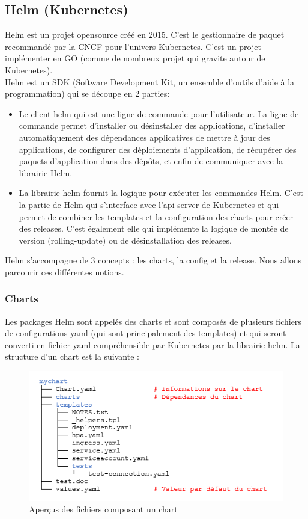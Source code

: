 \documentclass[11pt,fleqn]{book} %
\begin{document}
\subsection{Helm (Kubernetes)}
Helm est un projet opensource créé en 2015. C'est le gestionnaire de paquet recommandé par la CNCF pour l'univers Kubernetes. C'est un projet implémenter en GO (comme de nombreux projet qui gravite autour de Kubernetes).\\

Helm est un SDK (Software Development Kit, un ensemble d’outils d’aide à la programmation) qui se découpe en 2 parties: 
\begin{itemize}
    \item Le client helm qui est une ligne de commande pour l'utilisateur. La ligne de commande permet d'installer ou désinstaller des applications, d'installer automatiquement des dépendances applicatives de mettre à jour des applications, de configurer des déploiements d'application, de récupérer des paquets d'application dans des dépôts, et enfin de communiquer avec la librairie Helm.
    \item La librairie helm fournit la logique pour exécuter les commandes Helm. C'est la partie de Helm qui s'interface avec l'api-server de Kubernetes et qui permet de combiner les templates et la configuration des charts pour créer des releases. C'est également elle qui implémente la logique de montée de version (rolling-update) ou de désinstallation des releases.
\end{itemize}

Helm s'accompagne de 3 concepts : les charts, la config et la release. Nous allons parcourir ces différentes notions.

\subsubsection{Charts}
Les packages Helm sont appelés des charts et sont composés de plusieurs fichiers de configurations yaml (qui sont principalement des templates) et qui seront converti en fichier yaml compréhensible par Kubernetes par la librairie helm. La structure d'un chart est la suivante :

\begin{figure}[H]\centering
\renewcommand{\figurename}{Tableau}
\includegraphics[scale=0.8]{Pictures/Comparaison/deployer/Kubernetes/helmChart.png}
\captionsetup{margin=1.5cm,format=hang,justification=justified}
\caption[]{Aperçus des fichiers composant un chart \newline}
\end{figure}
\end{document}

